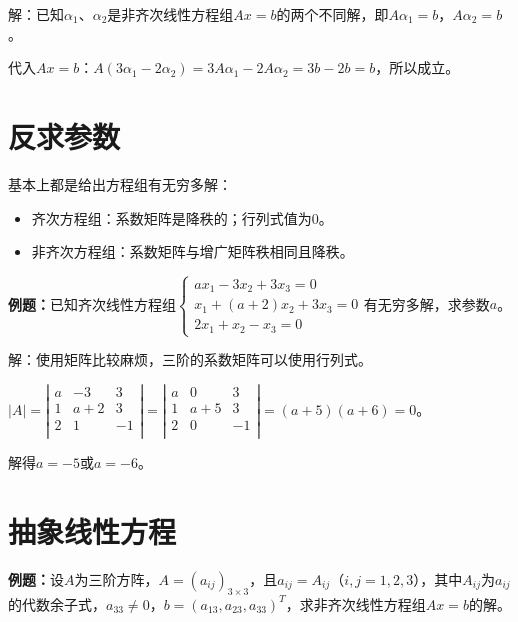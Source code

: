 \documentclass[UTF8, 12pt]{ctexart}
\begin{document}
解：已知$\alpha_1$、$\alpha_2$是非齐次线性方程组$Ax=b$的两个不同解，即$A\alpha_1=b$，$A\alpha_2=b$。

代入$Ax=b$：$A(3\alpha_1-2\alpha_2)=3A\alpha_1-2A\alpha_2=3b-2b=b$，所以成立。


\section{反求参数}

基本上都是给出方程组有无穷多解：

\begin{itemize}
    \item 齐次方程组：系数矩阵是降秩的；行列式值为0。
    \item 非齐次方程组：系数矩阵与增广矩阵秩相同且降秩。
\end{itemize}

\textbf{例题：}已知齐次线性方程组$\left\{\begin{array}{l}
    ax_1-3x_2+3x_3=0 \\
    x_1+(a+2)x_2+3x_3=0 \\
    2x_1+x_2-x_3=0
\end{array}\right.$有无穷多解，求参数$a$。

解：使用矩阵比较麻烦，三阶的系数矩阵可以使用行列式。

$\vert A\vert=\left\vert\begin{array}{ccc}
    a & -3 & 3 \\
    1 & a+2 & 3 \\
    2 & 1 & -1 \\
\end{array}\right\vert=\left\vert\begin{array}{ccc}
    a & 0 & 3 \\
    1 & a+5 & 3 \\
    2 & 0 & -1 \\
\end{array}\right\vert=(a+5)(a+6)=0$。

解得$a=-5$或$a=-6$。

\section{抽象线性方程}

\textbf{例题：}设$A$为三阶方阵，$A=(a_{ij})_{3\times3}$，且$a_{ij}=A_{ij}$（$i,j=1,2,3$），其中$A_{ij}$为$a_{ij}$的代数余子式，$a_{33}\neq0$，$b=(a_{13},a_{23},a_{33})^T$，求非齐次线性方程组$Ax=b$的解。
\end{document}
